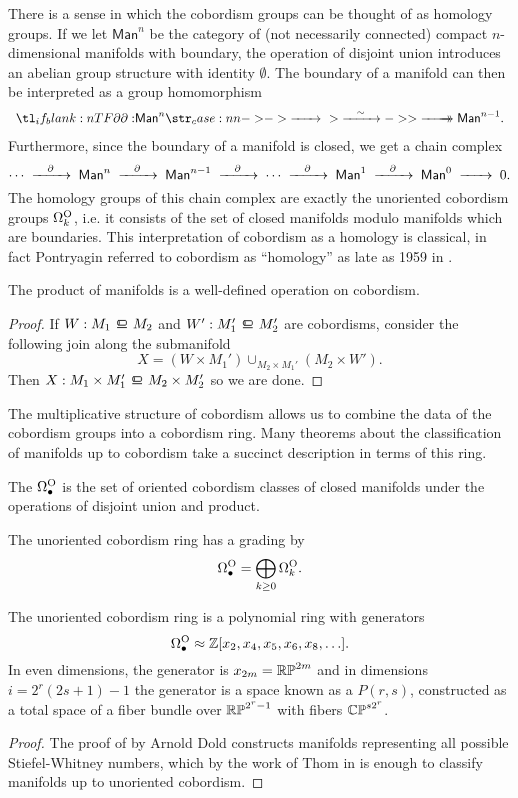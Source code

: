 \begin{remark}
	There is a sense in which the cobordism groups can be thought of as homology groups. If we let $\mathsf{Man}^n$ be the category of (not necessarily connected) compact $n$-dimensional manifolds with boundary, the operation of disjoint union introduces an abelian group structure with identity $\emptyset$.
	The boundary of a manifold can then be interpreted as a group homomorphism
	\[
		\lkxfunc{\partial}{\mathsf{Man}^n}{\mathsf{Man}^{n-1}.}
	\]
	Furthermore, since the boundary of a manifold is closed, we get a chain complex
	\[
		\cdots\lkxto[\partial] \mathsf{Man}^n\lkxto[\partial] \mathsf{Man}^{n-1}\lkxto[\partial]\cdots\lkxto[\partial] \mathsf{Man}^1 \lkxto[\partial] \mathsf{Man}^0 \lkxto 0.
	\]
	The homology groups of this chain complex are exactly the unoriented cobordism groups $\Omega_k^{\mathrm{O}}$, i.e. it consists of the set of closed manifolds modulo manifolds which are boundaries. This interpretation of cobordism as a homology is classical, in fact Pontryagin referred to cobordism as ``homology'' as late as 1959 in \cite{pontryagin1959homotopy}.

\begin{proposition}\label{prop:cobordism-product}
	The product of manifolds is a well-defined operation on cobordism.
\end{proposition}
\begin{proof}
	If $W : M_1\bord M_2$ and $W' : M_1'\bord M_2'$ are cobordisms, consider the following join along the submanifold
	\[
			X = (W\times M_1')\cup_{M_2\times M_1'} (M_2\times W').
	\]
	Then $X : M_1\times M_1' \bord M_2\times M_2'$ so we are done.
\end{proof}

The multiplicative structure of cobordism allows us to combine the data of the cobordism groups into a cobordism ring. Many theorems about the classification of manifolds up to cobordism take a succinct description in terms of this ring.

\begin{definition}
	The  $\Omega^{\mathrm{O}}_\bullet$ is the set of oriented cobordism classes of closed manifolds under the operations of disjoint union and product.
\end{definition}

The unoriented cobordism ring has a grading by
\[
	\Omega_\bullet^{\mathrm{O}} = \bigoplus_{k\geq 0} \Omega^{\mathrm{O}}_k.
\]

\begin{theorem}[Dold]
	The unoriented cobordism ring is a polynomial ring with generators
	\[
		\Omega^{\mathrm{O}}_\bullet \approx \mathbb{Z}[x_2, x_4, x_5, x_6, x_8,\ldots].
	\]
	In even dimensions, the generator is $x_{2m}=\mathbb{RP}^{2m}$ and in dimensions $i=2^r(2s+1)-1$ the generator is a space known as a  $P(r,s)$, constructed as a total space of a fiber bundle over $\mathbb{RP}^{2^r-1}$ with fibers $\mathbb{CP}^{s2^r}$.
\end{theorem}
\begin{proof}
	The proof of by Arnold Dold constructs manifolds representing all possible Stiefel-Whitney numbers, which by the work of Thom in \cite{thom1954} is enough to classify manifolds up to unoriented cobordism.


\end{proof}
\end{remark}

